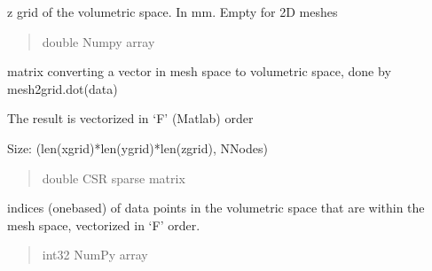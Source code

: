 \documentclass[letterpaper,10pt,english]{sphinxmanual}
\begin{document}
\begin{fulllineitems}
\begin{fulllineitems}
\end{fulllineitems}


\begin{fulllineitems}
\label{\detokenize{_autosummary/nirfasterff.base.data.meshvol:nirfasterff.base.data.meshvol.zgrid}}
\pysigstartsignatures
{}
\pysigstopsignatures
\sphinxAtStartPar
z grid of the volumetric space. In mm. Empty for 2D meshes
\begin{quote}\begin{description}
\sphinxAtStartPar
double Numpy array

\end{description}\end{quote}

\end{fulllineitems}


\begin{fulllineitems}
\label{\detokenize{_autosummary/nirfasterff.base.data.meshvol:nirfasterff.base.data.meshvol.mesh2grid}}
\pysigstartsignatures
{}
\pysigstopsignatures
\sphinxAtStartPar
matrix converting a vector in mesh space to volumetric space, done by mesh2grid.dot(data)

\sphinxAtStartPar
The result is vectorized in ‘F’ (Matlab) order

\sphinxAtStartPar
Size: (len(xgrid)*len(ygrid)*len(zgrid), NNodes)
\begin{quote}\begin{description}
\sphinxAtStartPar
double CSR sparse matrix

\end{description}\end{quote}

\end{fulllineitems}


\begin{fulllineitems}
\label{\detokenize{_autosummary/nirfasterff.base.data.meshvol:nirfasterff.base.data.meshvol.gridinmesh}}
\pysigstartsignatures
{}
\pysigstopsignatures
\sphinxAtStartPar
indices (one\sphinxhyphen{}based) of data points in the volumetric space that are within the mesh space, vectorized in ‘F’ order.
\begin{quote}\begin{description}
\sphinxAtStartPar
int32 NumPy array


\end{description}
\end{quote}
\end{fulllineitems}
\end{fulllineitems}
\end{document}
